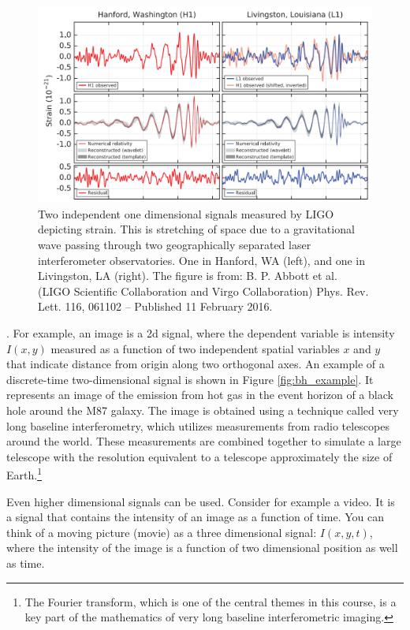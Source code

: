 \begin{figure}
\begin{center}
\includegraphics[width=\textwidth]{ch04/figures/dc_fg.png}
\end{center}
\caption{Two independent one dimensional signals measured by LIGO depicting strain. This is stretching of space due to a gravitational wave passing through two geographically separated laser interferometer observatories. One in Hanford, WA (left), and one in Livingston, LA (right). The figure is from: B. P. Abbott et al. (LIGO Scientific Collaboration
and Virgo Collaboration) Phys. Rev. Lett. 116, 061102 – Published 11
February 2016.}
\label{fig:ligo_meas}
\end{figure}

. For example, an image is a 2d
signal, where the dependent variable is intensity $I(x,y)$ measured as
a function of two independent spatial variables $x$ and $y$ that
indicate distance from origin along two orthogonal axes.  An example
of a discrete-time two-dimensional signal is shown in Figure
\ref{fig:bh_example}. It represents an image of the emission from hot gas in the
event horizon of a black hole around the M87 galaxy. The image is
obtained using a technique called very long baseline interferometry,
which utilizes measurements from radio telescopes around the
world. These measurements are combined together to simulate a large
telescope with the resolution equivalent to a telescope approximately
the size of Earth.\footnote{The Fourier transform, which is one of the
central themes in this course, is a key part of the mathematics of
very long baseline interferometric imaging.}

Even higher dimensional signals can be used. Consider for example a
video. It is a signal that contains the intensity of an image as a
function of time. You can think of a moving picture (movie) as a three
dimensional signal: $I(x,y,t)$, where the intensity of the image is a
function of two dimensional position as well as time.

